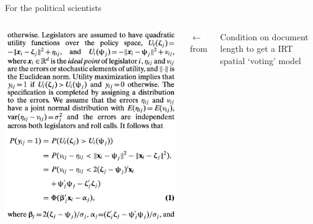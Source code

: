 \documentclass{hertieteaching}
\begin{document}
\begin{frame}{For the political scientists}

\begin{columns}[T,onlytextwidth]
\centerline{\includegraphics[scale=0.45]{pictures/ideal}}


$\longleftarrow$ from \textcite{Clinton.etal2004a}
\medskip

Condition on document length to get a IRT spatial `voting' model \parencite{Baker1994,Lang2004}

\end{columns}
	
\end{frame}
\end{document}
